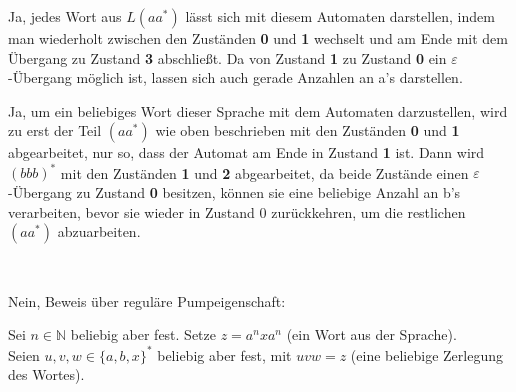 
\begin{aufgabe} %
\begin{teile}
    \item Ja, jedes Wort aus $L(aa^*)$ lässt sich mit diesem Automaten darstellen, indem man wiederholt zwischen den Zuständen \textbf{0} und \textbf{1} wechselt und am Ende mit dem Übergang zu Zustand \textbf{3} abschließt.
    Da von Zustand \textbf{1} zu Zustand \textbf{0} ein $\varepsilon$-Übergang möglich ist, lassen sich auch gerade Anzahlen an a's darstellen.
    \item Ja, um ein beliebiges Wort dieser Sprache mit dem Automaten darzustellen, wird zu erst der Teil $(aa^*)$ wie oben beschrieben mit den Zuständen \textbf{0} und \textbf{1} abgearbeitet, nur so, dass der Automat am Ende in Zustand \textbf{1} ist.
    Dann wird ${(bbb)}^*$ mit den Zuständen \textbf{1} und \textbf{2} abgearbeitet, da beide Zustände einen $\varepsilon$-Übergang zu Zustand \textbf{0} besitzen, können sie eine beliebige Anzahl an b's verarbeiten, bevor sie wieder in Zustand 0 zurückkehren,
    um die restlichen $(aa^*)$ abzuarbeiten.
    \item \ \\

    \item Nein, Beweis über reguläre Pumpeigenschaft:
    
    Sei $n \in \mathbb{N}$ beliebig aber fest. Setze $z = a^n x a^n$ (ein Wort aus der Sprache).
    \\Seien $u, v, w \in {\{a,b,x\}}^*$ beliebig aber fest, mit $uvw = z$ (eine beliebige Zerlegung des Wortes).


\end{teile}
\end{aufgabe}
